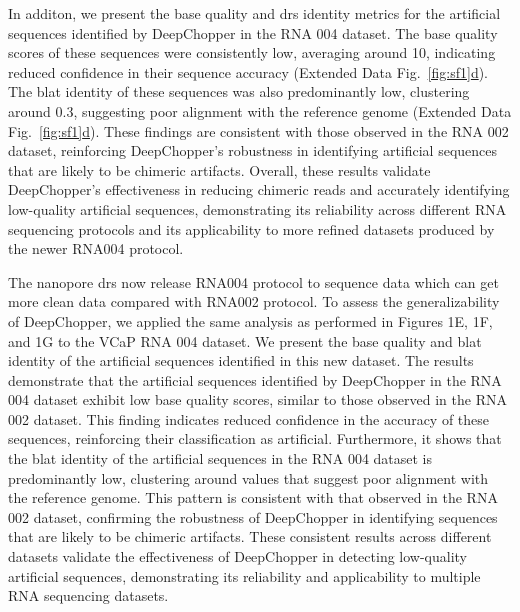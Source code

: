 \documentclass[pdflatex, sn-mathphys-num, lineno]{sn-jnl}%
\newcommand{\edfigref}[2]{Extended Data Fig.~\hyperref[#1]{\ref*{#1}#2}}
\theoremstyle{thmstyleone}%
\theoremstyle{thmstyletwo}%
\theoremstyle{thmstylethree}%
\begin{document}
In additon, we present the base quality and \gls{drs} identity metrics for the artificial sequences identified by DeepChopper in the RNA 004 dataset.
The base quality scores of these sequences were consistently low, averaging around 10, indicating reduced confidence in their sequence accuracy (\edfigref{fig:sf1}{d}).
The \gls{blat} identity of these sequences was also predominantly low, clustering around 0.3, suggesting poor alignment with the reference genome (\edfigref{fig:sf1}{d}).
These findings are consistent with those observed in the RNA 002 dataset, reinforcing DeepChopper's robustness in identifying artificial sequences that are likely to be chimeric artifacts.
Overall, these results validate DeepChopper's effectiveness in reducing chimeric reads and accurately identifying low-quality artificial sequences, demonstrating its reliability across different RNA sequencing protocols and its applicability to more refined datasets produced by the newer RNA004 protocol.



The nanopore \gls{drs} now release RNA004 protocol to sequence data which can get more clean data compared with RNA002 protocol.
To assess the generalizability of DeepChopper, we applied the same analysis as performed in Figures 1E, 1F, and 1G to the VCaP RNA 004 dataset.
We present the base quality and \gls{blat} identity of the artificial sequences identified in this new dataset.
The results demonstrate that the artificial sequences identified by DeepChopper in the RNA 004 dataset exhibit low base quality scores, similar to those observed in the RNA 002 dataset.
This finding indicates reduced confidence in the accuracy of these sequences, reinforcing their classification as artificial.
Furthermore, it shows that the \gls{blat} identity of the artificial sequences in the RNA 004 dataset is predominantly low, clustering around values that suggest poor alignment with the reference genome.
This pattern is consistent with that observed in the RNA 002 dataset, confirming the robustness of DeepChopper in identifying sequences that are likely to be chimeric artifacts.
These consistent results across different datasets validate the effectiveness of DeepChopper in detecting low-quality artificial sequences, demonstrating its reliability and applicability to multiple RNA sequencing datasets.
\end{document}
